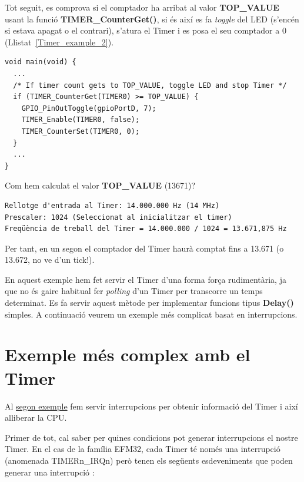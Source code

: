 Tot seguit, es comprova si el comptador ha arribat al valor {\bf TOP\_VALUE} usant la funció {\bf TIMER\_CounterGet()}, si és així es fa {\em toggle} del LED (s'encén si estava apagat o el contrari), s'atura el Timer i es posa el seu comptador a 0 (Llistat~\ref{Timer_example_2}).

\begin{lstlisting}[style=customc, label=Timer_example_2, caption=Codi per comprovar si el Timer ha arribat a cert valor]
void main(void) {
  ...
  /* If timer count gets to TOP_VALUE, toggle LED and stop Timer */
  if (TIMER_CounterGet(TIMER0) >= TOP_VALUE) {
    GPIO_PinOutToggle(gpioPortD, 7);
    TIMER_Enable(TIMER0, false);
    TIMER_CounterSet(TIMER0, 0);
  }
  ...
}
\end{lstlisting}

Com hem calculat el valor {\bf TOP\_VALUE} (13671)?

\begin{verbatim}
Rellotge d'entrada al Timer: 14.000.000 Hz (14 MHz)
Prescaler: 1024 (Seleccionat al inicialitzar el timer)
Freqüència de treball del Timer = 14.000.000 / 1024 = 13.671,875 Hz
\end{verbatim}

Per tant, en un segon el comptador del Timer haurà comptat fins a 13.671 (o 13.672, no ve d'un tick!).

En aquest exemple hem fet servir el Timer d'una forma força rudimentària, ja que no és gaire habitual fer {\em polling} d'un Timer per transcorre un temps determinat. Es fa servir aquest mètode per implementar funcions tipus {\bf Delay()} simples. A continuació veurem un exemple més complicat basat en interrupcions.

\section{Exemple més complex amb el Timer}
\label{sub:Timers_exemple_2}
Al \href{https://github.com/mariusmm/cursembedded/tree/master/Simplicity/Timer_2}{segon exemple} fem servir interrupcions
per obtenir informació del Timer i així alliberar la CPU.

Primer de tot, cal saber per quines condicions pot generar interrupcions el nostre Timer. En el cas de la família EFM32, cada Timer té només una interrupció (anomenada TIMERn\_IRQn) però tenen els següents esdeveniments que poden generar una interrupció \cite{EFM32GRM}:

